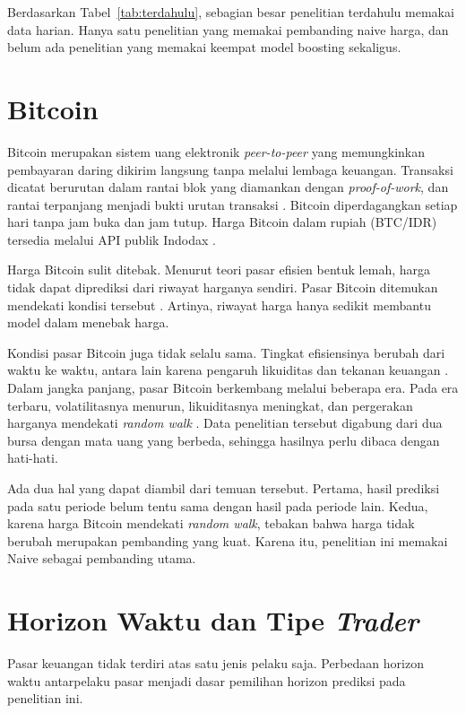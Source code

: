 Berdasarkan Tabel~\ref{tab:terdahulu}, sebagian besar penelitian terdahulu
memakai data harian. Hanya satu penelitian yang memakai pembanding naive
harga, dan belum ada penelitian yang memakai keempat model boosting
sekaligus.


\section{Bitcoin}
Bitcoin merupakan sistem uang elektronik \textit{peer-to-peer} yang
memungkinkan pembayaran daring dikirim langsung tanpa melalui lembaga
keuangan. Transaksi dicatat berurutan dalam rantai blok yang diamankan dengan
\textit{proof-of-work}, dan rantai terpanjang menjadi bukti urutan transaksi
\cite{nakamoto2008}.
Bitcoin diperdagangkan setiap hari tanpa jam buka dan jam tutup.
Harga Bitcoin dalam rupiah (BTC/IDR) tersedia melalui API publik Indodax
\cite{indodaxapi}.

Harga Bitcoin sulit ditebak. Menurut teori pasar efisien bentuk lemah, harga
tidak dapat diprediksi dari riwayat harganya sendiri. Pasar Bitcoin ditemukan
mendekati kondisi tersebut \cite{yi2023}. Artinya, riwayat harga hanya sedikit
membantu model dalam menebak harga.

Kondisi pasar Bitcoin juga tidak selalu sama. Tingkat efisiensinya berubah
dari waktu ke waktu, antara lain karena pengaruh likuiditas dan tekanan
keuangan \cite{mokni2024}. Dalam jangka panjang, pasar Bitcoin berkembang
melalui beberapa era. Pada era terbaru, volatilitasnya menurun, likuiditasnya
meningkat, dan pergerakan harganya mendekati \textit{random walk}
\cite{do2026}. Data penelitian tersebut digabung dari dua bursa dengan mata
uang yang berbeda, sehingga hasilnya perlu dibaca dengan hati-hati.

Ada dua hal yang dapat diambil dari temuan tersebut. Pertama, hasil prediksi
pada satu periode belum tentu sama dengan hasil pada periode lain. Kedua,
karena harga Bitcoin mendekati \textit{random walk}, tebakan bahwa harga tidak
berubah merupakan pembanding yang kuat. Karena itu, penelitian ini memakai
Naive sebagai pembanding utama.


\section{Horizon Waktu dan Tipe \textit{Trader}}
Pasar keuangan tidak terdiri atas satu jenis pelaku saja. Perbedaan horizon
waktu antarpelaku pasar menjadi dasar pemilihan horizon prediksi pada
penelitian ini.

